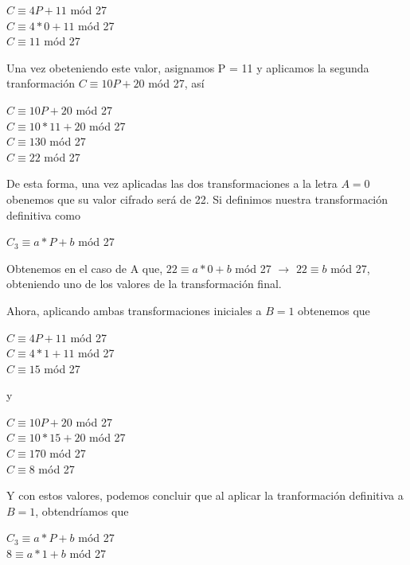 \documentclass[12pt]{article}
\begin{document}
\begin{center}
    $C \equiv 4P + 11$ mód 27 \\
    $C \equiv 4*0 + 11$ mód 27 \\
    $C \equiv 11$ mód 27
\end{center}


Una vez obeteniendo este valor, asignamos P = 11 y aplicamos la segunda tranformación $C \equiv 10P + 20$ mód 27, así 

\begin{center}
    $C \equiv 10P + 20$ mód 27 \\
    $C \equiv 10*11 + 20$ mód 27 \\
    $C \equiv 130$ mód 27 \\
    $C \equiv 22$ mód 27 \\
\end{center}

De esta forma, una vez aplicadas las dos transformaciones a la letra $A = 0$ obenemos que su valor cifrado será de 22. Si definimos nuestra transformación definitiva como 
\begin{center}
    $C_{3} \equiv a*P + b$ mód 27
\end{center}

Obtenemos en el caso de A que, $22 \equiv a * 0 + b$ mód 27 $\rightarrow$ $22 \equiv b$ mód 27, obteniendo uno de los valores de la transformación final. 

Ahora, aplicando ambas transformaciones iniciales a $B = 1$ obtenemos que 
\begin{center}
    $C \equiv 4P + 11$ mód 27 \\
    $C \equiv 4*1 + 11$ mód 27 \\
    $C \equiv 15$ mód 27
\end{center}

y 

\begin{center}
    $C \equiv 10P + 20$ mód 27 \\
    $C \equiv 10*15 + 20$ mód 27 \\
    $C \equiv 170$ mód 27 \\
    $C \equiv 8$ mód 27 \\
\end{center}

Y con estos valores, podemos concluir que al aplicar la tranformación definitiva a $B = 1$, obtendríamos que 
\begin{center}
    $C_{3} \equiv a*P + b$ mód 27 \\ 
    $8 \equiv a*1 + b$ mód 27 \\ 
\end{center} 
\end{document}
